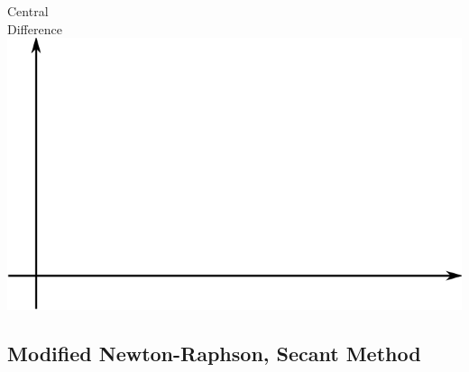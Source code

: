 \documentclass[fleqn]{beamer} %
\newcommand{\sectionIIsubsectionVtitle}{Modified Newton-Raphson, Secant Method}
\begin{document}
\begin{frame}
\begin{multicols}{3}
					Central\\
					Difference\\
					\includegraphics[scale=.14]{images/lecture4_fig1.png}\\
				
				\end{multicols}

				\btVFill 
			\end{frame}

		\subsection{\sectionIIsubsectionVtitle}\label{sectionIIsubsectionV}
\end{document}
